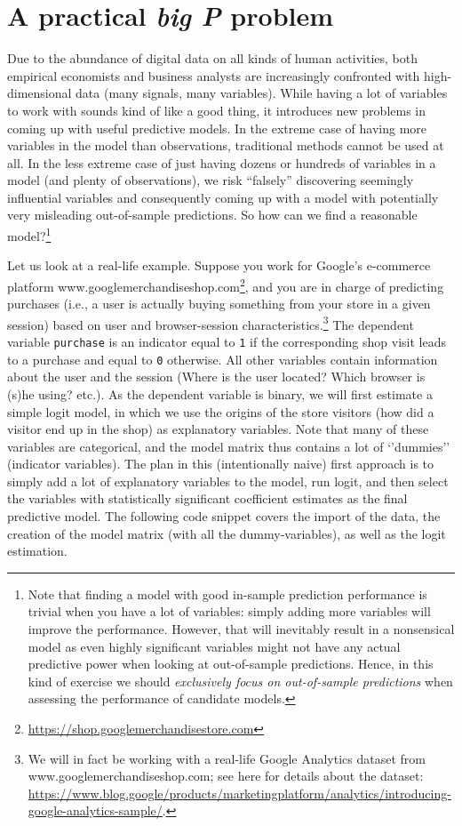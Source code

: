 \documentclass[
  12pt,
]{style/krantz}
\renewcommand{\href}[2]{#2\footnote{\url{#1}}}
\begin{document}
\hypertarget{a-practical-big-p-problem}{%
\section{\texorpdfstring{A practical \emph{big P} problem}{A practical big P problem}}\label{a-practical-big-p-problem}}

Due to the abundance of digital data on all kinds of human activities, both empirical economists and business analysts are increasingly confronted with high-dimensional data (many signals, many variables). While having a lot of variables to work with sounds kind of like a good thing, it introduces new problems in coming up with useful predictive models. In the extreme case of having more variables in the model than observations, traditional methods cannot be used at all. In the less extreme case of just having dozens or hundreds of variables in a model (and plenty of observations), we risk ``falsely'' discovering seemingly influential variables and consequently coming up with a model with potentially very misleading out-of-sample predictions. So how can we find a reasonable model?\footnote{Note that finding a model with good in-sample prediction performance is trivial when you have a lot of variables: simply adding more variables will improve the performance. However, that will inevitably result in a nonsensical model as even highly significant variables might not have any actual predictive power when looking at out-of-sample predictions. Hence, in this kind of exercise we should \emph{exclusively focus on out-of-sample predictions} when assessing the performance of candidate models.}

Let us look at a real-life example. Suppose you work for Google's e-commerce platform \href{https://shop.googlemerchandisestore.com}{www.googlemerchandiseshop.com}, and you are in charge of predicting purchases (i.e., a user is actually buying something from your store in a given session) based on user and browser-session characteristics.\footnote{We will in fact be working with a real-life Google Analytics dataset from www.googlemerchandiseshop.com; see here for details about the dataset: \url{https://www.blog.google/products/marketingplatform/analytics/introducing-google-analytics-sample/}.} The dependent variable \texttt{purchase} is an indicator equal to \texttt{1} if the corresponding shop visit leads to a purchase and equal to \texttt{0} otherwise. All other variables contain information about the user and the session (Where is the user located? Which browser is (s)he using? etc.). As the dependent variable is binary, we will first estimate a simple logit model, in which we use the origins of the store visitors (how did a visitor end up in the shop) as explanatory variables. Note that many of these variables are categorical, and the model matrix thus contains a lot of `'dummies'' (indicator variables). The plan in this (intentionally naive) first approach is to simply add a lot of explanatory variables to the model, run logit, and then select the variables with statistically significant coefficient estimates as the final predictive model. The following code snippet covers the import of the data, the creation of the model matrix (with all the dummy-variables), as well as the logit estimation.
\end{document}
